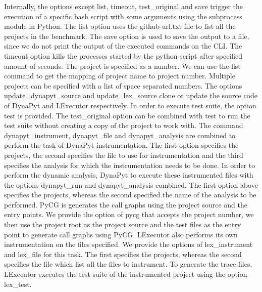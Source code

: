 Internally, the options except list, timeout, test\_original and save trigger the execution of a specific bash script with some arguments using the subprocess module in Python.
The list option uses the github-url.txt file to list all the projects in the benchmark.
The save option is used to save the output to a file, since we do not print the output of the executed commands on the CLI.
The timeout option kills the processes started by the python script after specified amount of seconds.
The project is specified as a number.
We can use the list command to get the mapping of project name to project number.
Multiple projects can be specified with a list of space separated numbers.
The options update\_dynapyt\_source and update\_lex\_source clone or update the source code of DynaPyt and LExecutor respectively.
In order to execute test suite, the option test is provided.
The test\_original option can be combined with test to run the test suite without creating a copy of the project to work with.
The command dynapyt\_instrument, dynapyt\_file and dynapyt\_analysis are combined to perform the task of DynaPyt instrumentation.
The first option specifies the projects, the second specifies the file to use for instrumentation and the third specifies the analysis for which the instrumentation needs to be done.
In order to perform the dynamic analysis, DynaPyt to execute these instrumented files with the options dynapyt\_run and dynapyt\_analysis combined.
The first option above specifies the projects, whereas the second specified the name of the analysis to be performed.
PyCG is generates the call graphs using the project source and the entry points.
We provide the option of pycg that accepts the project number, we then use the project root as the project source and the test files as the entry point to generate call graphs using PyCG.
LExecutor also performs its own instrumentation on the files specified.
We provide the options of lex\_instrument and lex\_file for this task.
The first specifies the projects, whereas the second specifies the file which list all the files to instrument.
To generate the trace files, LExecutor executes the test suite of the instrumented project using the option lex\_test.

